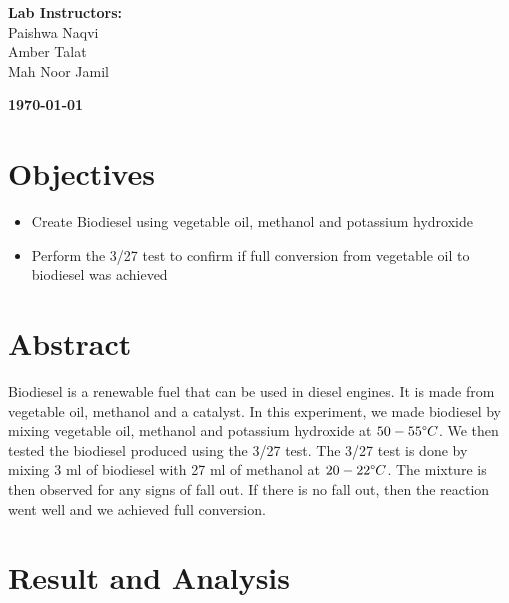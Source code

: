 \documentclass[a4paper, 12pt, english]{article}
\begin{document}
\begin{titlepage}
\begin{center}
		\vspace{45pt}
		\textbf {\large Lab Instructors:}\\[0.2cm]
		\Large {Paishwa Naqvi}\\[0.1cm]
		\Large {Amber Talat}\\[0.1cm]
		\Large {Mah Noor Jamil}\\[0.1cm]
	\end{center}

	\par
	\vfill
	\begin{center}
		\textbf{\today}\\
	\end{center}

\end{titlepage}



\newpage
\section{Objectives}
\begin{itemize}
	\item Create Biodiesel using vegetable oil, methanol and potassium hydroxide
	\item Perform the 3/27 test to confirm if full conversion from vegetable oil to
	      biodiesel was achieved
\end{itemize}

\section{Abstract}
Biodiesel is a renewable fuel that can be used in diesel engines. It is made
from vegetable oil, methanol and a catalyst. In this experiment, we made
biodiesel by mixing vegetable oil, methanol and potassium hydroxide at
$50-55\degree C$. We then tested the biodiesel produced using the 3/27 test.
The 3/27 test is done by mixing 3 ml of biodiesel with 27 ml of methanol at
$20-22\degree C$. The mixture is then observed for any signs of fall out. If
there is no fall out, then the reaction went well and we achieved full
conversion.

\section{Result and Analysis}
\end{document}
